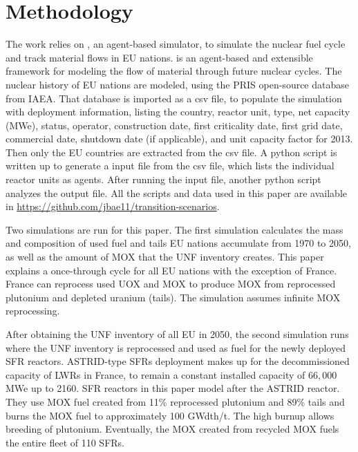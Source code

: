 \section{Methodology}
The work relies on \Cyclus, an agent-based simulator, to simulate the nuclear fuel cycle
and track material flows in \gls{EU} nations. \Cyclus is an agent-based and extensible
framework for modeling the flow of material through future nuclear cycles. 
The nuclear history of EU nations are modeled, using the \gls{PRIS} open-source 
database from \gls{IAEA}. That database is imported as a csv file, to populate the simulation
with deployment information, listing the country, reactor unit, type, net capacity (MWe), status,
operator, construction date, first criticality date, first grid date, commercial date, shutdown
date (if applicable), and unit capacity factor for 2013. Then only the \gls{EU} countries are extracted
from the csv file. A python script is written up to generate a \Cyclus input file from the csv file,
which lists the individual reactor units as agents. After running the \Cyclus input file,
another python script analyzes the output file. All the scripts and data used
in this paper are available in \url{https://github.com/jbae11/transition-scenarios}.

Two \Cyclus simulations are run for this paper. 
The first simulation calculates
the mass and composition of used fuel and tails \gls{EU} nations accumulate from 1970 to 2050,
as well as the amount of \gls{MOX} that the \gls{UNF} inventory creates.
This paper explains a once-through cycle for all 
\gls{EU} nations with the exception of France. France can reprocess used \gls{UOX} and \gls{MOX} to
produce \gls{MOX} from reprocessed plutonium and depleted uranium (tails).
The simulation assumes infinite \gls{MOX} reprocessing. 

After obtaining the \gls{UNF} inventory of all \gls{EU} in 2050, the second
simulation runs where the \gls{UNF} inventory is reprocessed and used
as fuel for the newly deployed \gls{SFR} reactors.
ASTRID-type \glspl{SFR} deployment makes up for the decommissioned capacity
of \glspl{LWR} in France, to remain a constant installed capacity of $66,000$ MWe up to 2160.
\gls{SFR} reactors in this paper model after the ASTRID reactor.
They use \gls{MOX} fuel created from 11\% reprocessed plutonium
and 89\% tails and burns the \gls{MOX} fuel to approximately 100 GWdth/t.
The high burnup allows breeding of plutonium.
Eventually, the  \gls{MOX} created from recycled \gls{MOX}
fuels the entire fleet of 110 \glspl{SFR}.


